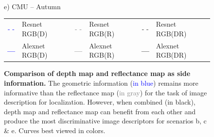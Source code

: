 \begin{figure}
\begin{minipage}{0.19\linewidth}
		e) CMU -- Autumn
	\end{minipage}
	
	\vspace{0.2cm}
	
	\begin{scriptsize}
	\begin{tabular}{c l c l c l }

		\textcolor{blue}{\Large{- -}} & Resnet RGB(D) & 
		\textcolor{gray}{\Large{- -}} & Resnet RGB(R) & 
		\Large{- -} & Resnet RGB(DR) \\
		\textcolor{blue}{\textbf{\Large{---}}} & Alexnet RGB(D) & 
		\textcolor{gray}{\textbf{\Large{---}}} & Alexnet RGB(R) &
		\textbf{\Large{---}} & Alexnet RGB(DR) \\
	\end{tabular}		
	\end{scriptsize}
	
	\caption[Comparison of depth map and reflectance map as side information]{\label{fig:ref_vs_depth} \textbf{Comparison of depth map and reflectance map as side information.} The geometric information (\textcolor{blue}{in blue}) remains more informative than the reflectance map (\textcolor{gray}{in gray}) for the task of image description for localization. However, when combined (in black), depth map and reflectance map can benefit from each other and produce the most discriminative image descriptors for scenarios b, c \& e. Curves best viewed in colors.}
\end{figure}